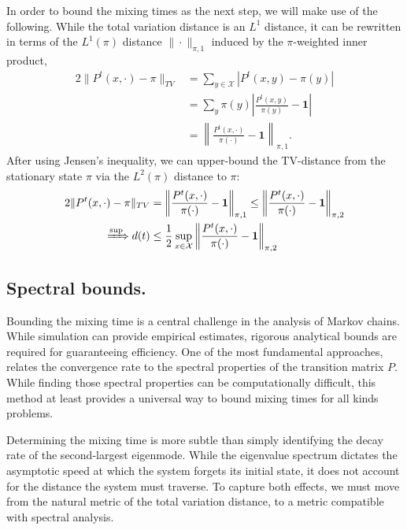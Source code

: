 In order to bound the mixing times as the next step, we will make use of the following.
While the total variation distance is an $L^1$ distance, it can be rewritten in terms of the $L^1(\pi)$ distance $\|\cdot\|_{\pi, 1}$ induced by the $\pi$-weighted inner product, 
\begin{equation}
    \label{eq:tv-1norm}
    \begin{split}
        2\|P^t(x,\cdot) - \pi \|_{TV} &= \sum_{y\in\mathcal{X}} |P^t(x, y) - \pi(y)| \\
        &= \sum_{y} \pi(y) \left|\frac{P^t(x, y)}{\pi(y)} - \mathbf{1}\right| \\
        &= \left\|\frac{P^t(x, \cdot)}{\pi(\cdot)} - \mathbf{1}\right\|_{\pi, 1}.
    \end{split}
\end{equation}
After using Jensen's inequality, we can upper-bound the TV-distance from the stationary state $\pi$ via the $L^2(\pi)$ distance to $\pi$:
\begin{equation}
    \label{eq:tv-2norm}
    \begin{aligned}
          2\|P^t(x,\cdot) - \pi \|_{TV} &= \left\|\frac{P^t(x, \cdot)}{\pi(\cdot)} - \mathbf{1}\right\|_{\pi, 1} \leq \left\| \frac{P^t(x, \cdot)}{\pi(\cdot)} - \mathbf{1}\right\|_{\pi, 2} \\
          \quad \xRightarrow{\sup} d(t) &\leq \frac{1}{2} \sup_{x\in\mathcal{X}}\left\| \frac{P^t(x, \cdot)}{\pi(\cdot)} - \mathbf{1}\right\|_{\pi, 2} 
    \end{aligned}
\end{equation}

\smallskip
\subsection{Spectral bounds.} Bounding the mixing time is a central challenge in the analysis of Markov chains. While simulation can provide empirical estimates, rigorous analytical bounds are required for guaranteeing efficiency. One of the most fundamental approaches, relates the convergence rate to the spectral properties of the transition matrix $P$. While finding those spectral properties can be computationally difficult, this method at least provides a universal way to bound mixing times for all kinds problems.

Determining the mixing time is more subtle than simply identifying the decay rate of the second-largest eigenmode. While the eigenvalue spectrum dictates the asymptotic speed at which the system forgets its initial state, it does not account for the distance the system must traverse. To capture both effects, we must move from the natural metric of the total variation distance, to a metric compatible with spectral analysis.

